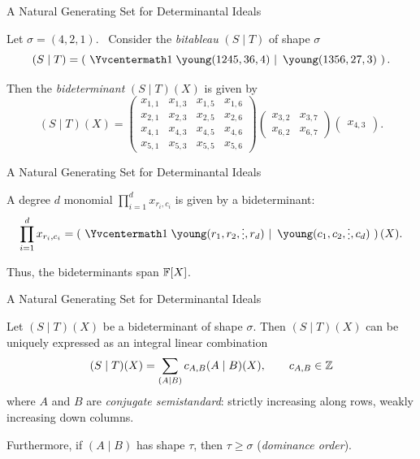\documentclass[aspectratio=169]{beamer}
\newcommand{\svdots}{\raisebox{-0.12\height}[0pt][0pt]{$\vdots$}}
\begin{document}
\begin{frame}{A Natural Generating Set for Determinantal Ideals}
  \begin{defn}[Bideterminants]
    Let $\sigma = (4, 2, 1)$.\ \pause
    Consider the \emph{bitableau} $(S \mid T)$ of shape $\sigma$
    \[
        (S \mid T) = \left(\ \Yvcentermath1 \left. \young(1245,36,4)\ \right\vert\ \young(1356,27,3) \ \right).
    \]

    \pause

    Then the \emph{bideterminant} $(S \mid T)(X)$ is given by
    \[
      (S \mid T)(X) =
      \begin{pmatrix}
        x_{1, 1} & x_{1, 3} & x_{1, 5} & x_{1, 6} \\
        x_{2, 1} & x_{2, 3} & x_{2, 5} & x_{2, 6} \\
        x_{4, 1} & x_{4, 3} & x_{4, 5} & x_{4, 6} \\
        x_{5, 1} & x_{5, 3} & x_{5, 5} & x_{5, 6}
      \end{pmatrix}
      \begin{pmatrix}
        x_{3, 2} & x_{3, 7} \\
        x_{6, 2} & x_{6, 7}
      \end{pmatrix}
      \begin{pmatrix}
        x_{4, 3}
      \end{pmatrix}.
    \]
  \end{defn}
\end{frame}

\newcommand{\ra}{r_1}
\newcommand{\rb}{r_2}
\newcommand{\rd}{r_d}
\newcommand{\ca}{c_1}
\newcommand{\cb}{c_2}
\newcommand{\cd}{c_d}

\begin{frame}{A Natural Generating Set for Determinantal Ideals}
    \begin{lem}
        A degree $d$ monomial $\prod_{i = 1}^d x_{r_i, c_i}$ is given by a bideterminant: \pause
        \[
    	      \prod_{i = 1}^d x_{r_i, c_i} = \left(\ \Yvcentermath1 \left.\young(\ra,\rb,\svdots,\rd) \ \right\vert\ \young(\ca,\cb,\svdots,\cd) \ \right)(X).
        \]
    \end{lem}
    \pause
    Thus, the bideterminants span $\mathbb{F}[X]$.
\end{frame}

\begin{frame}{A Natural Generating Set for Determinantal Ideals}
  \begin{thrm}
    Let $(S \mid T)(X)$ be a bideterminant of shape $\sigma$.
    \pause
    Then $(S \mid T)(X)$ can be uniquely expressed as an integral linear combination
    \[
        (S \mid T)(X) = \sum_{(A \mid B)} c_{A, B} (A \mid B)(X), \qquad c_{A, B} \in \mathbb{Z}
    \]
    where $A$ and $B$ are \emph{conjugate semistandard}: strictly increasing along rows, weakly increasing down columns.

    \pause
    \vspace{10pt}

    Furthermore, if $(A \mid B)$ has shape $\tau$, then $\tau \geq \sigma$ (\emph{dominance order}).
  \end{thrm}
\end{frame}
\end{document}
